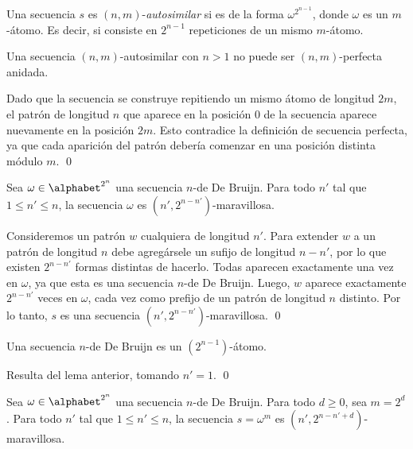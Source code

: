 \begin{defi}
  Una secuencia $s$ es $(n,m)$-\emph{autosimilar} si es de la forma
  $\omega^{2^{n-1}}$, donde $\omega$ es un $m$-átomo. Es decir, si consiste
  en $2^{n-1}$ repeticiones de un mismo $m$-átomo.
\end{defi}

\begin{lema}
  \label{lema:autosimilar-cannot-be-np}
  Una secuencia $(n,m)$-autosimilar con $n > 1$ no puede ser $(n,m)$-perfecta
  anidada.
\end{lema}

\begin{demo}
  Dado que la secuencia se construye repitiendo %
 un mismo
  átomo de longitud $2m$, el patrón de longitud $n$ que aparece en la posición
  $0$ de la secuencia aparece nuevamente en la posición $2m$. Esto contradice
  la definición de secuencia perfecta, ya que cada aparición del patrón debería
  comenzar en una posición distinta módulo $m$. \qed
\end{demo}

\begin{lema}
  Sea $\omega \in \alphabet^{2^n}$ una secuencia $n$-de De Bruijn. Para todo
  $n'$ tal que $1 \leq n' \leq n$, la secuencia $\omega$ es
  $(n',2^{n-n'})$-maravillosa.
\end{lema}

\begin{demo}
  Consideremos un patrón $w$ cualquiera de longitud $n'$. Para extender $w$ a
  un patrón de longitud $n$ debe agregársele un sufijo de longitud $n-n'$, por
  lo que existen $2^{n-n'}$ formas distintas de hacerlo. Todas 
aparecen exactamente una vez en $\omega$, ya que esta es
  una secuencia $n$-de De Bruijn. Luego, $w$ aparece exactamente $2^{n-n'}$
  veces en $\omega$, cada vez como prefijo de un patrón de longitud $n$
  distinto. Por lo tanto, $s$ es una secuencia $(n',2^{n-n'})$-maravillosa.
  \qed
\end{demo}

\begin{coro}
  Una secuencia $n$-de De Bruijn es un $(2^{n-1})$-átomo.
\end{coro}

\begin{demo}
  Resulta del lema anterior, tomando $n' = 1$. \qed
\end{demo}

\begin{lema}
  Sea $\omega \in \alphabet^{2^n}$ una secuencia $n$-de De Bruijn. Para todo
  $d \geq 0$, sea $m = 2^d$. Para todo $n'$ tal que $1 \leq n' \leq n$, la
  secuencia $s = \omega^{m}$ es $(n',2^{n-n'+d})$-maravillosa.
\end{lema}

